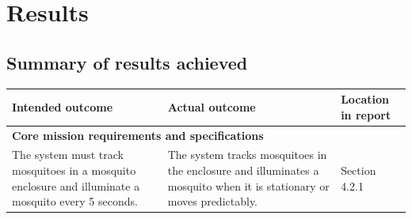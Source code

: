 
\section{Results}

\subsection{Summary of results achieved}
\begin{table}[H]
  \centering
  \begin{tabularx}{\textwidth}{|X|X|l|}
    \hline
    \textbf{Intended outcome}                                                                                                                                                    &
    \textbf{Actual outcome}                                                                                                                                                      &
    \textbf{Location in report}                                                                                                                                                                                                                                                                                                                            \\
    \hline
    \multicolumn{3}{|l|}{\textbf{Core mission requirements and specifications}}                                                                                                                                                                                                                                                                            \\
    \hline
    The system must track mosquitoes in a mosquito enclosure and illuminate a mosquito every 5 seconds.                                                                          &
    The system tracks mosquitoes in the enclosure and illuminates a mosquito when it is stationary or moves predictably.                                                         &
    Section 4.2.1                                                                                                                                                                                                                                                                                                                                          \\

\end{tabularx}
\end{table}
